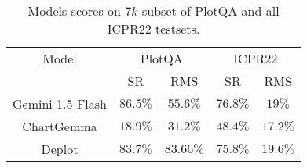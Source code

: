 \begin{table}
 \begin{tabular}{ |c|c|c|c|c|}
 Model & \multicolumn{2}{|c|}{PlotQA} & \multicolumn{2}{|c|}{ICPR22} \\
 & SR & RMS & SR & RMS \\
     Gemini 1.5 Flash & $86.5\%$ & $55.6\%$ & $76.8\%$ & $19\%$ \\
 ChartGemma & $18.9\%$ &  $31.2\%$ & $48.4\%$ & $17.2\%$ \\
     Deplot & $83.7\%$ & $83.66\%$ & $75.8\%$ & $19.6\%$ \\
 \end{tabular}
 \caption{Models scores on $7k$ subset of PlotQA and all ICPR22 testsets.}
 \label{tab:final-scores}
  \end{table}
